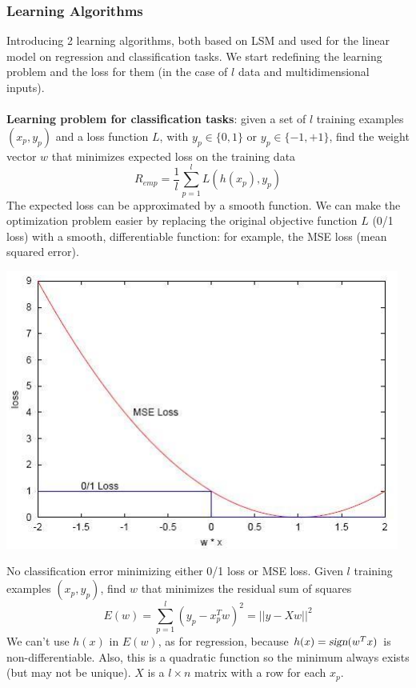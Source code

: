 \documentclass[10pt]{report}
\begin{document}
\subsubsection{Learning Algorithms} Introducing 2 learning algorithms, both based on LSM and used for the linear model on regression and classification tasks. We start redefining the learning problem and the loss for them (in the case of $l$ data and multidimensional inputs).\\\\
\textbf{Learning problem for classification tasks}: given a set of $l$ training examples $(x_p, y_p)$ and a loss function $L$, with $y_p \in \{0,1\}$ or $y_p \in \{-1, +1\}$, find the weight vector $w$ that minimizes expected loss on the training data $$R_{emp} = \frac{1}{l}\sum_{p=1}^l L(h(x_p), y_p)$$
The expected loss can be approximated by a smooth function. We can make the optimization problem easier by replacing the original objective function $L$ (0/1 loss) with a smooth, differentiable function: for example, the MSE loss (mean squared error).
\begin{center}
	\includegraphics[scale=0.75]{4.png}
\end{center}
No classification error minimizing either 0/1 loss or MSE loss. Given $l$ training examples $(x_p, y_p)$, find $w$ that minimizes the residual sum of squares $$E(w)= \sum_{p=1}^l (y_p - x_p^T w)^2 = ||y - Xw||^2$$
We can't use $h(x)$ in $E(w)$, as for regression, because $h(x) = \textsl{sign}(w^T x)$ is non-differentiable. Also, this is a quadratic function so the minimum always exists (but may not be unique). $X$ is a $l\times n$ matrix with a row for each $x_p$.
\end{document}
